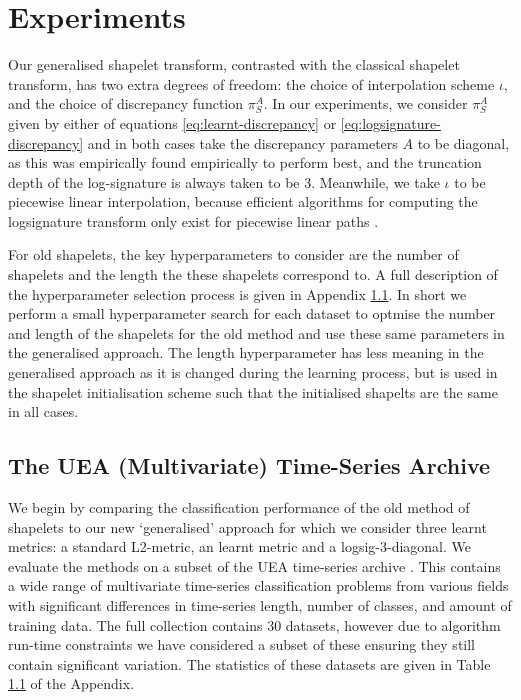 \section{Experiments}
Our generalised shapelet transform, contrasted with the classical shapelet transform, has two extra degrees of freedom: the choice of interpolation scheme $\iota$, and the choice of discrepancy function $\pi^A_S$. In our experiments, we consider $\pi^A_S$ given by either of equations \eqref{eq:learnt-discrepancy} or \eqref{eq:logsignature-discrepancy} and in both cases take the discrepancy parameters $A$ to be diagonal, as this was empirically found empirically to perform best, and the truncation depth of the log-signature is always taken to be $3$. Meanwhile, we take $\iota$ to be piecewise linear interpolation, because efficient algorithms for computing the logsignature transform only exist for piecewise linear paths \cite{signatory}.

For old shapelets, the key hyperparameters to consider are the number of shapelets and the length the these shapelets correspond to. A full description of the hyperparameter selection process is given in Appendix \ref{}. In short we perform a small hyperparameter search for each dataset to optmise the number and length of the shapelets for the old method and use these same parameters in the generalised approach. The length hyperparameter has less meaning in the generalised approach as it is changed during the learning process, but is used in the shapelet initialisation scheme such that the initialised shapelts are the same in all cases.

\subsection{The UEA (Multivariate) Time-Series Archive}
We begin by comparing the classification performance of the old method of shapelets to our new `generalised' approach for which we consider three learnt metrics: a standard L2-metric, an learnt metric and a logsig-3-diagonal. We evaluate the methods on a subset of the UEA time-series archive \cite{bagnall2018uea}. This contains a wide range of multivariate time-series classification problems from various fields with significant differences in time-series length, number of classes, and amount of training data. The full collection contains 30 datasets, however due to algorithm run-time constraints we have considered a subset of these ensuring they still contain significant variation. The statistics of these datasets are given in Table \ref{} of the Appendix.

